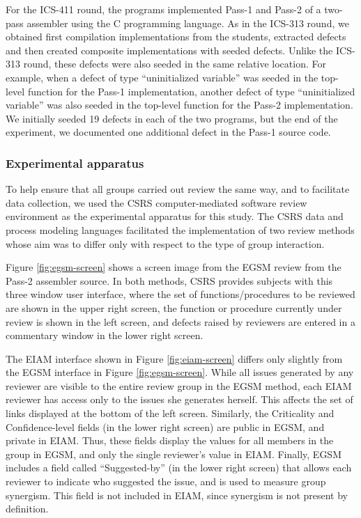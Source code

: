 For the ICS-411 round, the programs implemented Pass-1 and Pass-2 of a
two-pass assembler using the C programming language. As in the ICS-313
round, we obtained first compilation implementations from the students,
extracted defects and then created composite implementations with seeded
defects.  Unlike the ICS-313 round, these defects were also seeded in the
same relative location.  For example, when a defect of type ``uninitialized
variable'' was seeded in the top-level function for the Pass-1
implementation, another defect of type ``uninitialized variable'' was also
seeded in the top-level function for the Pass-2 implementation.  We
initially seeded 19 defects in each of the two programs, but the end of the
experiment, we documented one additional defect in the Pass-1 source code.



\subsubsection{Experimental apparatus}

To help ensure that all groups carried out review the same way, and to 
facilitate data collection, we used the CSRS computer-mediated software
review environment as the experimental apparatus for this study.  The
CSRS data and process modeling languages facilitated the implementation of
two review methods whose aim was to differ only with respect to the type of 
group interaction.

Figure \ref{fig:egsm-screen} shows a screen image from the EGSM review from the
Pass-2 assembler source.  In both methods, CSRS provides subjects with this
three window user interface, where the set of functions/procedures to be
reviewed are shown in the upper right screen, the function or procedure
currently under review is shown in the left screen, and defects raised by
reviewers are entered in a commentary window in the lower right screen.


\begin{figure*}[htb]
{\centerline {}}
 \caption{{\em An EGSM screen image from the ICS-411 round.}}
 \label{fig:egsm-screen}
\end{figure*}


The EIAM interface shown in Figure \ref{fig:eiam-screen} differs only slightly
from the EGSM interface in Figure \ref{fig:egsm-screen}.  While all issues
generated by any reviewer are visible to the entire review group
in the EGSM method, each EIAM reviewer has access only to the issues she
generates herself. This affects the set of
links displayed at the bottom of the left screen. Similarly, the
Criticality and Confidence-level fields (in the lower right screen) are
public in EGSM, and private in EIAM. Thus, these fields display the values
for all members in the group in EGSM, and only the single reviewer's value
in EIAM.  Finally, EGSM includes a field called ``Suggested-by'' (in the
lower right screen) that allows each reviewer to indicate who suggested the
issue, and is used to measure group synergism. This field is not included in
EIAM, since synergism is not present by definition.


